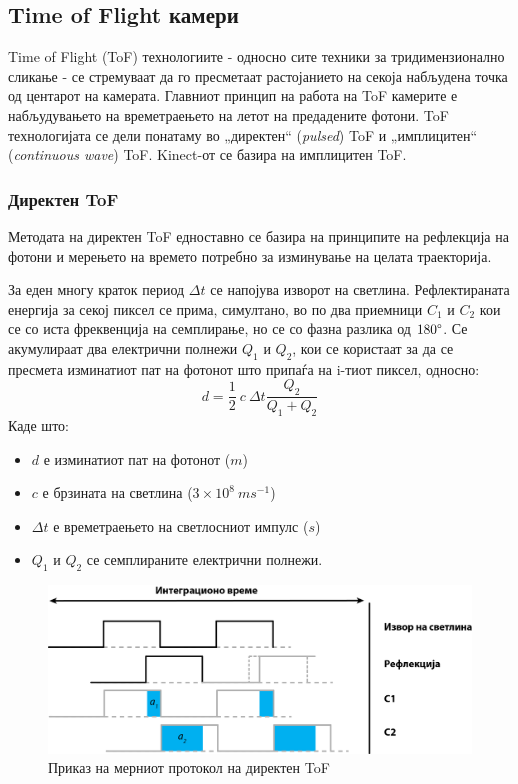 \documentclass[12pt]{article}
\begin{document}
  \subsection{Time of Flight камери}
		Time of Flight (ToF) технологиите - односно сите техники за тридимензионално сликање - се стремуваат да го пресметаат растојанието на секоја набљудена точка од центарот на камерата. Главниот принцип на работа на ToF камерите е набљудувањето на времетраењето на летот на предадените фотони. ToF технологијата се дели понатаму во „директен“ (\textit{pulsed}) ToF и „имплицитен“ (\textit{continuous wave}) ToF. Kinect-от се базира на имплицитен ToF.

	\subsubsection{Директен ToF}
		Методата на директен ToF едноставно се базира на принципите на рефлекција на фотони и мерењето на времето потребно за изминување на целата траекторија.

		За еден многу краток период $ \Delta t $ се напојува изворот на светлина. Рефлектираната енергија за секој пиксел се прима, симултано, во по два приемници $C_1$ и $C_2$ кои се со иста фреквенција на семплирање, но се со фазна разлика од $180 \degree$. Се акумулираат два електрични полнежи $Q_1$ и  $Q_2$, кои се користаат за да се пресмета изминатиот пат на фотонот што припаѓа на i-тиот пиксел, односно:
		$$ d = \frac{1}{2} \ c\  \Delta t \frac{Q_2}{Q_1 + Q_2} $$
		Каде што:
		\begin{itemize}
			\item $d$ е изминатиот пат на фотонот ($m$)
			\item $c$ е брзината на светлина ($ 3 \times 10^8\ ms^{-1} $)
			\item $\Delta t$ е времетраењето на светлосниот импулс ($s$)
			\item $Q_1$ и $Q_2$ се семплираните електрични полнежи.
			\end{itemize}

		\begin{figure}[H]
			\includegraphics[width=0.75\linewidth]{./images/impulseToF.png}
			\centering
			\caption{Приказ на мерниот протокол на директен ToF}
			\label{fig:impulseToF.png}
			\end{figure}
\end{document}
